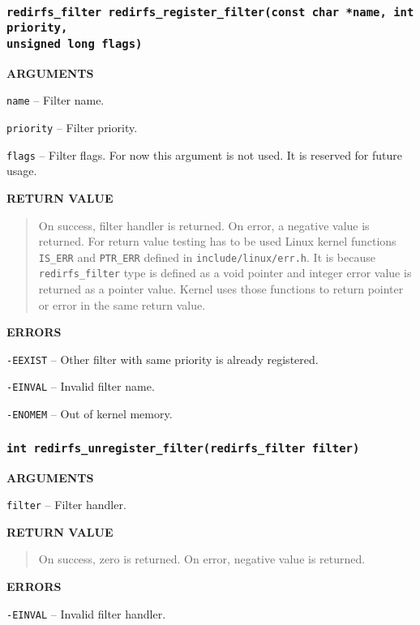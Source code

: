 \subsubsection{\texttt{redirfs\_filter  redirfs\_register\_filter(const char *name,
int priority,\\unsigned long flags)}} 
\begin{list}{}{}
	\item \textbf{ARGUMENTS}
		\begin{list}{}{}
			\item \texttt{name} -- Filter name.
			\item \texttt{priority} -- Filter priority.
			\item \texttt{flags} -- Filter flags. For now this argument
				is not used. It is reserved for future usage.
		\end{list}
	\item \textbf{RETURN VALUE}
		\begin{quotation}
			\noindent On success, filter handler is returned. On
			error, a
			negative value is returned. For return value testing has to be
			used Linux kernel functions \texttt{IS\_ERR} and
			\texttt{PTR\_ERR} defined in \texttt{include/linux/err.h}. It
			is because \texttt{redirfs\_filter} type is defined as a void
			pointer and integer error value is returned as a pointer
			value. Kernel uses those functions to return pointer or error
			in the same return value.
		\end{quotation}
	\item \textbf{ERRORS}
		\begin{list}{}{}
			\item \texttt{-EEXIST} -- Other filter with same priority is
				already registered.
			\item \texttt{-EINVAL} -- Invalid filter name.
			\item \texttt{-ENOMEM} -- Out of kernel memory.
		\end{list}
\end{list}

\subsubsection{\texttt{int redirfs\_unregister\_filter(redirfs\_filter filter)}} 
\begin{list}{}{}
	\item \textbf{ARGUMENTS}
		\begin{list}{}{}
			\item \texttt{filter} -- Filter handler.
		\end{list}
	\item \textbf{RETURN VALUE}
		\begin{quotation}
			\noindent On success, zero is returned. On error, negative
			value is returned.
		\end{quotation}
	\item \textbf{ERRORS}
		\begin{list}{}{}
			\item \texttt{-EINVAL} -- Invalid filter handler.
		\end{list}
\end{list}

